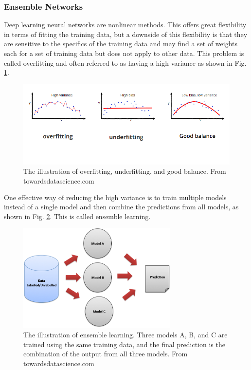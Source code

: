 \subsubsection{Ensemble Networks}
Deep learning neural networks are nonlinear methods. This offers great flexibility in terms of fitting the training data, but a downside of this flexibility is that they are sensitive to the specifics of the training data and may find a set of weights each for a set of training data but does not apply to other data. This problem is called overfitting and often referred to as having a high variance \cite{goodfellow2016deep} as shown in Fig. \ref{fig_over_under_fitting}.
\begin{figure}[h!]
\begin{center}
\includegraphics[width = 13cm]{img/over_under_fiting.png}
\caption[The illustration of overfitting, underfitting, and good balance]{The illustration of overfitting, underfitting, and good balance. From towardsdatascience.com \label{fig_over_under_fitting}}
\end{center}
\end{figure}

One effective way of reducing the high variance is to train multiple models instead of a single model and then combine the predictions from all models, as shown in Fig. \ref{fig_ensemble_learning}. This is called ensemble learning.
\begin{figure}[h!]
\begin{center}
\includegraphics[width = 8cm]{img/ensemble_learning.png}
\caption[The illustration of ensemble learning]{The illustration of ensemble learning. Three models A, B, and C are trained using the same training data, and the final prediction is the combination of the output from all three models. From towardsdatascience.com \label{fig_ensemble_learning}}
\end{center}
\end{figure}
